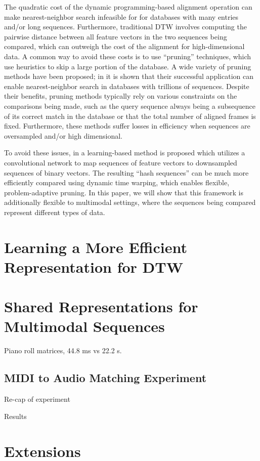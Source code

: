 \documentclass{article} %
\begin{document}
The quadratic cost of the dynamic programming-based alignment operation can make nearest-neighbor search infeasible for for databases with many entries and/or long sequences.
Furthermore, traditional DTW involves computing the pairwise distance between all feature vectors in the two sequences being compared, which can outweigh the cost of the alignment for high-dimensional data.
A common way to avoid these costs is to use ``pruning'' techniques, which use heuristics to skip a large portion of the database.
A wide variety of pruning methods have been proposed; in \cite{rakthanmanon2012searching} it is shown that their successful application can enable nearest-neighbor search in databases with trillions of sequences.
Despite their benefits, pruning methods typically rely on various constraints on the comparisons being made, such as the query sequence always being a subsequence of its correct match in the database or that the total number of aligned frames is fixed.
Furthermore, these methods suffer losses in efficiency when sequences are oversampled and/or high dimensional.

To avoid these issues, in \cite{raffel2015large} a learning-based method is proposed which utilizes a convolutional network to map sequences of feature vectors to downsampled sequences of binary vectors.
The resulting ``hash sequences'' can be much more efficiently compared using dynamic time warping, which enables flexible, problem-adaptive pruning.
In this paper, we will show that this framework is additionally flexible to multimodal settings, where the sequences being compared represent different types of data.

\section{Learning a More Efficient Representation for DTW}

\cite{raffel2015large}

\section{Shared Representations for Multimodal Sequences}

Piano roll matrices, 44.8 ms vs 22.2 s.

\subsection{MIDI to Audio Matching Experiment}

Re-cap of experiment

Results

\section{Extensions}


\small

\end{document}
